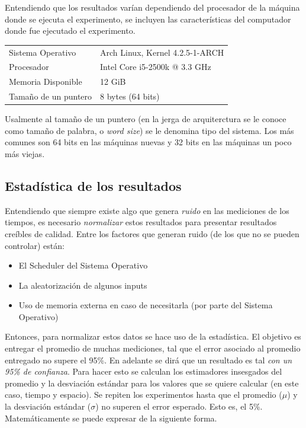 \documentclass[12pt,letterpaper]{report}
\begin{document}
Entendiendo que los resultados varían dependiendo del procesador de la máquina donde se ejecuta el experimento, se incluyen las características del computador donde fue ejecutado el experimento.\\

\begin{tabular}{ll}
  Sistema Operativo & Arch Linux, Kernel 4.2.5-1-ARCH\\
  Procesador & Intel Core i5-2500k @ 3.3 GHz\\
  Memoria Disponible & 12 GiB\\
  Tamaño de un puntero & 8 bytes (64 bits)\\
\end{tabular}

Usalmente al tamaño de un puntero (en la jerga de arquiterctura se le conoce como tamaño de palabra, o \emph{word size}) se le denomina tipo del sistema. Los más comunes son 64 bits en las máquinas nuevas y 32 bits en las máquinas un poco más viejas.

\subsection{Estadística de los resultados}
\label{subsec:estadistica}

Entendiendo que siempre existe algo que genera \emph{ruido} en las mediciones de los tiempos, es necesario \emph{normalizar} estos resultados para presentar resultados creíbles de calidad. Entre los factores que generan ruido (de los que no se pueden controlar) están:

\begin{itemize}
\item El Scheduler del Sistema Operativo
\item La aleatorización de algunos inputs
\item Uso de memoria externa en caso de necesitarla (por parte del Sistema Operativo)
\end{itemize}

Entonces, para normalizar estos datos se hace uso de la estadística. El objetivo es entregar el promedio de muchas mediciones, tal que el error asociado al promedio entregado no supere el 95\%. En adelante se dirá que un resultado es tal \emph{con un 95\% de confianza}. Para hacer esto se calculan los estimadores insesgados del promedio y la desviación estándar para los valores que se quiere calcular (en este caso, tiempo y espacio). Se repiten los experimentos hasta que el promedio ($\mu$) y la desviación estándar ($\sigma$) no superen el error esperado. Esto es, el 5\%. Matemáticamente se puede expresar de la siguiente forma.
\end{document}
